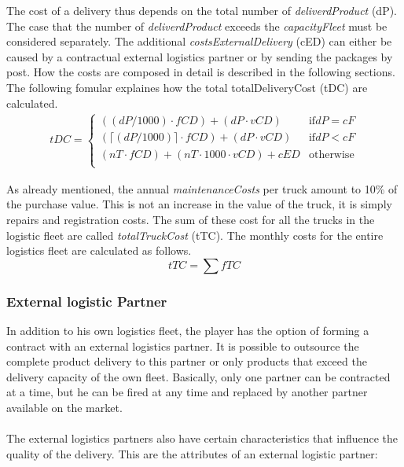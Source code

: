 The cost of a delivery thus depends on the total number of \textit{deliverdProduct} (\gls{dP}). 
The case that the number of \textit{deliverdProduct} exceeds the \textit{capacityFleet} must be considered separately. The additional \textit{costsExternalDelivery} (\gls{cED}) can either be caused by a contractual external logistics partner or by sending the packages by post. How the costs are composed in detail is described in the following sections. \\
The following fomular explaines how the total totalDeliveryCost (\gls{tDC}) are calculated. 
\begin{equation}
\label{func:deliveryCost}
\begin{aligned}
tDC = 
\begin{cases}
    (( dP / 1000) \cdot fCD) + ( dP \cdot vCD) & \text{if} dP = cF\\
    (\lceil (dP / 1000) \rceil \cdot fCD ) + ( dP \cdot vCD) & \text{if} dP < cF\\
    ( nT \cdot fCD ) + ( nT \cdot1000 \cdot vCD ) + cED & \text{otherwise}\\
\end{cases}
\end{aligned}
\end{equation}

As already mentioned, the annual \textit{maintenanceCosts}  per truck amount to 10\% of the purchase value. This is not an increase in the value of the truck, it is simply repairs and registration costs. The sum of these cost for all the trucks in the logistic fleet are called \textit{totalTruckCost} (\gls{tTC}). The monthly costs for the entire logistics fleet are calculated as follows. 
\begin{equation}
    tTC = \sum fTC
\end{equation}


\subsubsection{External logistic Partner}
In addition to his own logistics fleet, the player has the option of forming a contract with an external logistics partner. It is possible to outsource the complete product delivery to this partner or only products that exceed the delivery capacity of the own fleet. Basically, only one partner can be contracted at a time, but he can be fired at any time and replaced by another partner available on the market. \\
\\
The external logistics partners also have certain characteristics that influence the quality of the delivery. This are the attributes of an external logistic partner:  

